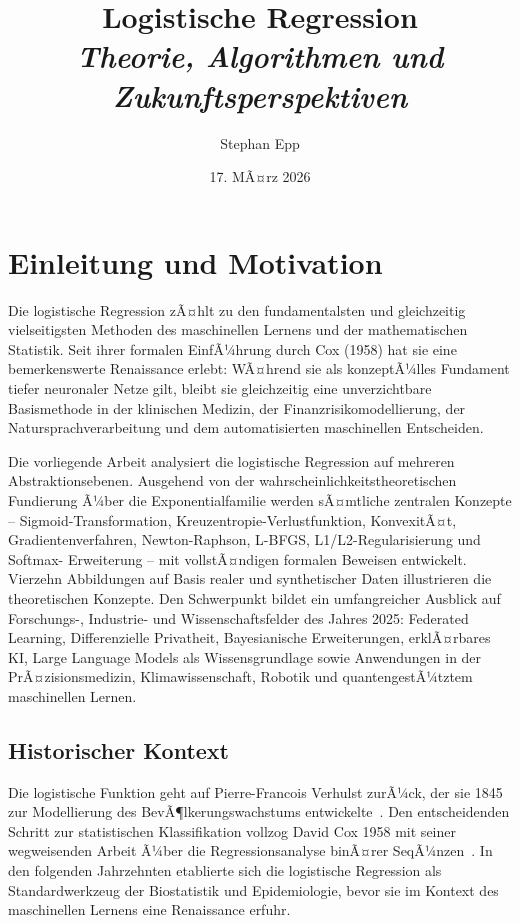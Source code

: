 ﻿\documentclass[12pt, a4paper]{article}
\title{\textbf{Logistische Regression}\\
	{\Large\itshape Theorie, Algorithmen und Zukunftsperspektiven}}
\author{Stephan Epp}
\date{17. MÃ¤rz 2026}
\theoremstyle{definition}
\theoremstyle{remark}
\begin{document}

\maketitle
\tableofcontents
\newpage

\section{Einleitung und Motivation}

Die logistische Regression zÃ¤hlt zu den fundamentalsten und gleichzeitig vielseitigsten
Methoden des maschinellen Lernens und der mathematischen Statistik. Seit ihrer formalen
EinfÃ¼hrung durch Cox (1958) hat sie eine bemerkenswerte Renaissance erlebt: WÃ¤hrend sie
als konzeptÃ¼lles Fundament tiefer neuronaler Netze gilt, bleibt sie gleichzeitig eine
unverzichtbare Basismethode in der klinischen Medizin, der Finanzrisikomodellierung, der
Natursprachverarbeitung und dem automatisierten maschinellen Entscheiden.

Die vorliegende Arbeit analysiert die logistische Regression auf mehreren Abstraktionsebenen.
Ausgehend von der wahrscheinlichkeitstheoretischen Fundierung Ã¼ber die Exponentialfamilie
werden sÃ¤mtliche zentralen Konzepte -- Sigmoid-Transformation, Kreuzentropie-Verlustfunktion,
KonvexitÃ¤t, Gradientenverfahren, Newton-Raphson, L-BFGS, L1/L2-Regularisierung und Softmax-
Erweiterung -- mit vollstÃ¤ndigen formalen Beweisen entwickelt. Vierzehn Abbildungen auf Basis
realer und synthetischer Daten illustrieren die theoretischen Konzepte. Den Schwerpunkt bildet
ein umfangreicher Ausblick auf Forschungs-, Industrie- und Wissenschaftsfelder des Jahres 2025:
Federated Learning, Differenzielle Privatheit, Bayesianische Erweiterungen, erklÃ¤rbares KI,
Large Language Models als Wissensgrundlage sowie Anwendungen in der PrÃ¤zisionsmedizin,
Klimawissenschaft, Robotik und quantengestÃ¼tztem maschinellen Lernen.

\subsection{Historischer Kontext}

Die logistische Funktion geht auf Pierre-Francois Verhulst zurÃ¼ck, der sie 1845 zur Modellierung
des BevÃ¶lkerungswachstums entwickelte~\citep{verhulst1845recherches}. Den entscheidenden Schritt
zur statistischen Klassifikation vollzog David Cox 1958 mit seiner wegweisenden Arbeit Ã¼ber die
Regressionsanalyse binÃ¤rer SeqÃ¼nzen~\citep{cox1958regression}. In den folgenden Jahrzehnten
etablierte sich die logistische Regression als Standardwerkzeug der Biostatistik und
Epidemiologie, bevor sie im Kontext des maschinellen Lernens eine Renaissance erfuhr.
\end{document}
